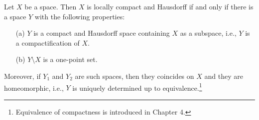 \begin{thm}
    Let $X$ be a space.
    Then $X$ is locally compact and Hausdorff if and only if there is a space $Y$ with the following properties:
    \begin{enumerate}
        \item[(a)]
        {
            $Y$ is a compact and Hausdorff space containing $X$ as a subspace, i.e., $Y$ is a compactification of $X$.
        }
        \item[(b)]
        {
            $Y\setminus X$ is a one-point set.
        }
    \end{enumerate}
    Moreover, if $Y_1$ and $Y_2$ are such spaces, then they coincides on $X$ and they are homeomorphic, i.e., $Y$ is uniquely determined up to equivalence.\footnote{Equivalence of compactness is introduced in Chapter 4.}
\end{thm}
